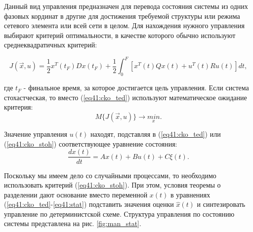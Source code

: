 Данный вид управления предназначен для перевода состояния системы из одних фазовых кординат в другие для достижения требуемой структуры или режима сетевого элемента или всей сети в целом. 
Для нахождения нужного управления выбирают критерий оптимальности, в качестве которого обычно используют среднеквадратичных критерий:


\begin{equation}\label{eq41:cko_ted}
J(\vec{x},u)=\frac{1}{2}x^T(t_F)Dx(t_F)+\frac{1}{2}\int^F_0[x^T(t)Qx(t)+u^T(t)Ru(t)]dt,
\end{equation}

\noindent где $t_F$ - финальное время, за которое достигается цель управления. Если система стохастческая, то вместо (\ref{eq41:cko_ted}) используют математическое ожидание критерия:
\begin{equation}\label{eq41:cko_stoh}
M\{J(\vec{x},u)\}\rightarrow \underset{x}{min}.
\end{equation}

Значение управления $u(t)$ находят,  подставляя в (\ref{eq41:cko_ted}) или (\ref{eq41:cko_stoh}) соответствующее уравнение состояния:
\begin{equation}\label{eq41:stat}
\frac{dx(t)}{dt}=Ax(t)+Bu(t)+C\xi(t).
\end{equation}

Поскольку мы имеем дело со случайными процессами, то необходимо использовать критерий (\ref{eq41:cko_stoh}).
При этом, условия теоремы о разделении дают основание вместо переменной $x(t)$ в уравнениях (\ref{eq41:cko_ted}-\ref{eq41:stat}) подставить значения оценки $\hat{x}(t)$ и синтезировать управление по детерминистской схеме.
Структура управления по состоянию системы представлена на рис. \ref{fig:man_stat}.

